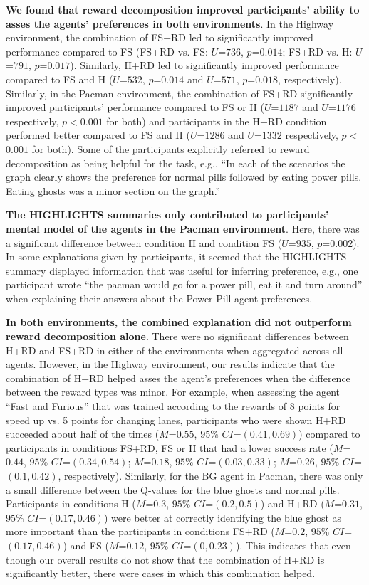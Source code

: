\documentclass[runningheads]{llncs}
\begin{document}
\textbf{We found that reward decomposition improved participants' ability to asses the agents' preferences in both environments}.
In the Highway environment, the combination of FS+RD 
led to significantly improved performance compared to FS 
(FS+RD vs. FS: $U$=$736$, $p$=$0.014$; FS+RD vs. H: $U$=$791$, $p$=$0.017$). 
Similarly, H+RD 
led to significantly improved performance compared to FS and H ($U$=$532$, $p$=$0.014$ and $U$=$571$, $p$=$0.018$, respectively).
Similarly, in the Pacman environment, the combination of FS+RD 
significantly improved participants' performance compared to FS or H
($U$=$1187$ and $U$=$1176$ respectively, $p$$<$$0.001$ for both) and participants in the H+RD condition 
performed better compared to FS and H ($U$=$1286$ and $U$=$1332$ respectively, $p$$<$$0.001$ for both).
Some of the participants explicitly referred to reward decomposition as being helpful for the task, e.g., ``In each of the scenarios the graph clearly shows the preference for normal pills followed by eating power pills. Eating ghosts was a minor section on the graph.''

\textbf{The HIGHLIGHTS summaries only contributed to participants' mental model of the agents in the Pacman environment}. 
Here, there was a significant difference between condition H and condition FS ($U$=$935$, $p$=$0.002$). In some explanations given by participants, it seemed that the HIGHLIGHTS summary displayed information that was useful for inferring preference, e.g., one participant wrote ``the pacman would go for a power pill, eat it and turn around'' when explaining their answers about the Power Pill agent preferences.

\textbf{In both environments, the combined explanation did not outperform reward decomposition alone}.
There were no significant differences between H+RD and FS+RD in either of the environments when aggregated across all agents.
However, in the Highway environment, our results indicate that the combination of H+RD helped asses the agent's preferences when the difference between the reward types was minor. 
For example, when assessing the agent ``Fast and Furious'' that was trained according to the rewards of 8 points for speed up vs. 5 points for changing lanes, participants who were shown H+RD succeeded about half of the times ($M$=$0.55$, $95\%$ $CI$=$(0.41,0.69)$) compared to participants in conditions FS+RD, FS or H that had a lower success rate ($M$=$0.44$, $95\%$ $CI$=$(0.34,0.54)$; $M$=$0.18$, $95\%$ $CI$=$(0.03,0.33)$; $M$=$0.26$, $95\%$ $CI$=$(0.1,0.42)$, respectively). 
Similarly, for the BG agent in Pacman, there was only a small difference between the Q-values for the blue ghosts and normal pills. 
Participants in conditions H ($M$=$0.3$, $95\%$ $CI$=$(0.2,0.5)$) and H+RD ($M$=$0.31$, $95\%$ $CI$=$(0.17,0.46)$) were better at correctly identifying the blue ghost as more important than the participants in conditions FS+RD ($M$=$0.2$, $95\%$ $CI$=$(0.17,0.46)$)  and FS ($M$=$0.12$, $95\%$ $CI$=$(0,0.23)$).
This indicates that even though our overall results do not show that the combination of H+RD is significantly better, there were cases in which this combination helped.
\end{document}
